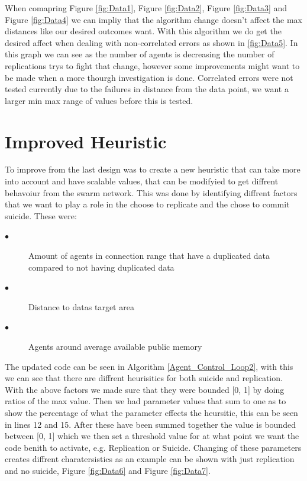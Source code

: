 \documentclass{UoYCSproject}
\begin{document}
When comapring Figure \ref{fig:Data1}, Figure \ref{fig:Data2}, Figure \ref{fig:Data3} and Figure \ref{fig:Data4} we can impliy that the algorithm change doesn't affect the max distances like our desired outcomes want.
With this algorithm we do get the desired affect when dealing with non-correlated errors as shown in \ref{fig:Data5}.
In this graph we can see as the number of agents is decreasing the number of replications trys to fight that change, however some improvements might want to be made when a more thourgh investigation is done.
Correlated errors were not tested currently due to the failures in distance from the data point, we want a larger min max range of values before this is tested.



\section{Improved Heuristic}
\label{sec:Simple2}

To improve from the last design was to create a new heuristic that can take more into account and have scalable values, that can be modifyied to get diffrent behavoiur from the swarm network.
This was done by identifying diffrent factors that we want to play a role in the choose to replicate and the chose to commit suicide.
These were:

\begin{description}
\item[$\bullet$] Amount of agents in connection range that have a duplicated data compared to not having duplicated data
\item[$\bullet$] Distance to datas target area
\item[$\bullet$] Agents around average available public memory
\end{description}

The updated code can be seen in Algorithm \ref{Agent_Control_Loop2}, with this we can see that there are diffrent heurisitics for both suicide and replication.
With the above factors we made sure that they were bounded [0, 1] by doing ratios of the max value.
Then we had parameter values that sum to one as to show the percentage of what the parameter effects the heursitic, this can be seen in lines 12 and 15.
After these have been summed together the value is bounded between [0, 1] which we then set a threshold value for at what point we want the code benith to activate, e.g. Replication or Suicide.
Changing of these parameters creates diffrent charatersistics as an example can be shown with just replication and no suicide, Figure \ref{fig:Data6} and Figure \ref{fig:Data7}.
\end{document}
